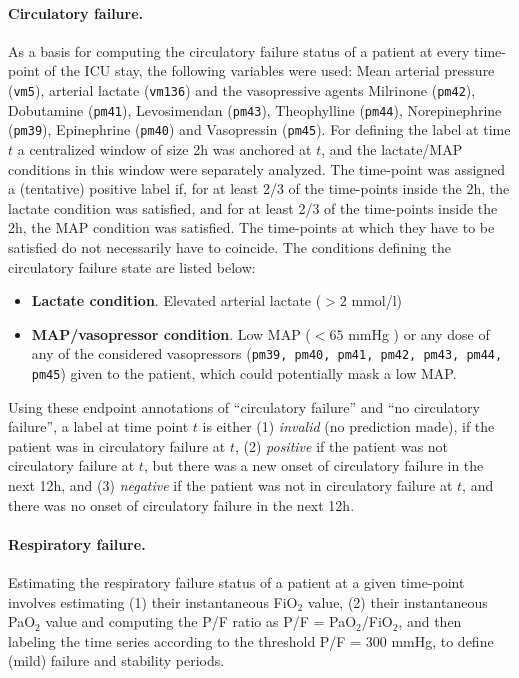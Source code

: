 \documentclass{article}
\begin{document}
\paragraph{Circulatory failure.}As a basis for computing the circulatory failure status of a patient at every time-point of the ICU stay, the following variables were used: Mean arterial pressure (\texttt{vm5}), arterial lactate (\texttt{vm136}) and the vasopressive agents Milrinone (\texttt{pm42}), Dobutamine (\texttt{pm41}), Levosimendan (\texttt{pm43}), Theophylline (\texttt{pm44}), Norepinephrine (\texttt{pm39}), Epinephrine (\texttt{pm40}) and Vasopressin (\texttt{pm45}). For defining the label at time $t$ a centralized window of size 2h was anchored at $t$, and the lactate/MAP conditions in this window were separately analyzed. The time-point was assigned a (tentative) positive label if, for at least 2/3 of the time-points inside the 2h, the lactate condition was satisfied, and for at least 2/3 of the time-points inside the 2h, the MAP condition was satisfied. 
The time-points at which they have to be satisfied do not necessarily have to coincide. The conditions defining the circulatory failure state are listed below:

\begin{itemize}
\item \textbf{Lactate condition}. Elevated arterial lactate ($>2$ mmol/l)
\item \textbf{MAP/vasopressor condition}. Low MAP ($<65$ mmHg ) or any dose 
of any of the considered vasopressors (\texttt{pm39, pm40, pm41, pm42, pm43, pm44, pm45})
given to the patient, which could potentially mask a low MAP.
\end{itemize}


Using these endpoint annotations of ``circulatory failure'' and ``no circulatory failure'', a label at time point $t$ is either (1) \textit{invalid} (no prediction made), if the patient was in circulatory failure at $t$, (2) \textit{positive} if the patient was not circulatory failure at $t$, but there was a new onset of circulatory failure in the next 12h, and (3) \textit{negative} if the patient was not in circulatory failure at $t$, and there was no onset of circulatory failure in the next 12h.

\paragraph{Respiratory failure.}Estimating the respiratory failure status of a patient at a given time-point involves estimating (1) their instantaneous FiO$_2$ value, (2) their instantaneous PaO$_2$ value and computing the P/F ratio as P/F = PaO$_2$/FiO$_2$, and then labeling the time series according to the threshold P/F = 300 mmHg, to define (mild) failure and stability periods.
\end{document}
